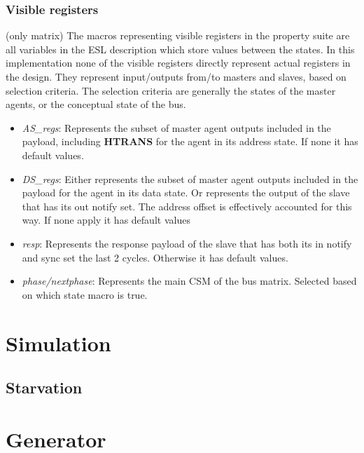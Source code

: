 \subsubsection{Visible registers}
(only matrix)
The macros representing visible registers in the property suite are all variables in the ESL description which store values between the states. In this implementation none of the visible registers directly represent actual registers in the design. They represent input/outputs from/to masters and slaves, based on selection criteria. The selection criteria are generally the states of the master agents, or the conceptual state of the bus. 
\begin{itemize}
 \item \textit{AS\_regs}: Represents the subset of master agent outputs included in the payload, including \textbf{HTRANS} for the agent in its address state. If none it has default values.
 \item \textit{DS\_regs}: Either represents the subset of master agent outputs included in the payload for the agent in its data state. Or represents the output of the slave that has its out notify set. The address offset is effectively accounted for this way. If none apply it has default values
 \item \textit{resp}: Represents the response payload of the slave that has both its in notify and sync set the last 2 cycles. Otherwise it has default values.
 \item \textit{phase/nextphase}: Represents the main CSM of the bus matrix. Selected based on which state macro is true.
\end{itemize} 




\section{Simulation}
\label{sec:sim}

\subsection{Starvation}

\section{Generator}
\label{sec:generator}
